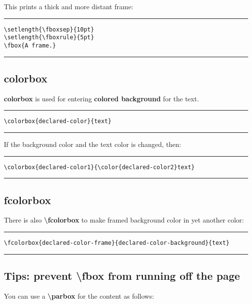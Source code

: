 This prints a thick and more distant frame:

\setlength{\fboxsep}{10pt}
\setlength{\fboxrule}{5pt}

\noindent\vspace{1em}\hrule
\begin{verbatim}
\setlength{\fboxsep}{10pt}
\setlength{\fboxrule}{5pt}
\fbox{A frame.}
\end{verbatim}
\noindent\hrule\vspace{1em}

\subsection{colorbox}
\textbf{colorbox} is used for entering \textbf{colored background} for the text.

\noindent\vspace{1em}\hrule
\begin{verbatim}
\colorbox{declared-color}{text}
\end{verbatim}
\noindent\hrule\vspace{1em}

If the background color and the text color is changed, then:

\noindent\vspace{1em}\hrule
\begin{verbatim}
\colorbox{declared-color1}{\color{declared-color2}text}
\end{verbatim}
\noindent\hrule\vspace{1em}

\subsection{fcolorbox}
There is also \textbf{\textbackslash fcolorbox} to make framed background color in yet another color:

\noindent\vspace{1em}\hrule
\begin{verbatim}
\fcolorbox{declared-color-frame}{declared-color-background}{text}
\end{verbatim}
\noindent\hrule\vspace{1em}

\subsection{Tips: prevent \textbackslash fbox from running off the page}
You can use a \textbf{\textbackslash parbox} for the content as follows:

